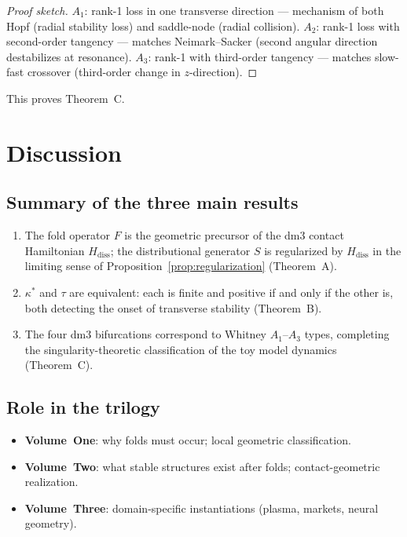 \documentclass[12pt, oneside]{book}
\theoremstyle{plain}
\theoremstyle{definition}
\theoremstyle{remark}
\begin{document}
\begin{proof}[Proof sketch]
$A_1$: rank-1 loss in one transverse direction --- mechanism of
both Hopf (radial stability loss) and saddle-node (radial
collision). $A_2$: rank-1 loss with second-order tangency ---
matches Neimark--Sacker (second angular direction destabilizes
at resonance). $A_3$: rank-1 with third-order tangency ---
matches slow-fast crossover (third-order change in $z$-direction).
\end{proof}

This proves Theorem~C.

\section{Discussion}
\label{sec:discussion}

\subsection{Summary of the three main results}

\begin{enumerate}[label=(\arabic*)]
  \item The fold operator $F$ is the geometric precursor of the
        dm3 contact Hamiltonian $H_{\mathrm{diss}}$; the
        distributional generator $S$ is regularized by
        $H_{\mathrm{diss}}$ in the limiting sense of
        Proposition~\ref{prop:regularization} (Theorem~A).
  \item $\kappa^*$ and $\tau$ are equivalent: each is finite
        and positive if and only if the other is, both detecting
        the onset of transverse stability (Theorem~B).
  \item The four dm3 bifurcations correspond to Whitney
        $A_1$--$A_3$ types, completing the singularity-theoretic
        classification of the toy model dynamics (Theorem~C).
\end{enumerate}

\subsection{Role in the trilogy}

\begin{itemize}[leftmargin=*]
  \item \textbf{Volume~One}: why folds must occur;
        local geometric classification.
  \item \textbf{Volume~Two}: what stable structures exist after
        folds; contact-geometric realization.
  \item \textbf{Volume~Three}: domain-specific instantiations
        (plasma, markets, neural geometry).
\end{itemize}
\end{document}
